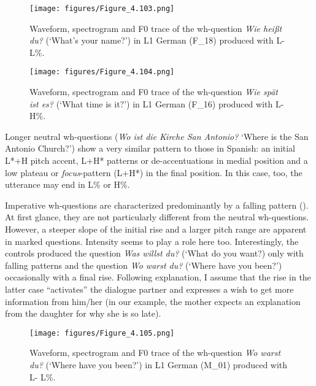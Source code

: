 \begin{figure}


\texttt{[image: figures/Figure\_4.103.png]}


\caption{Waveform, spectrogram and F0 trace of the wh-question \textit{Wie heißt du?} (‘What’s your name?’) in L1 German (F\_18) produced with L- L\%.}
\label{fig:4.103}
\end{figure}

\begin{figure}


\texttt{[image: figures/Figure\_4.104.png]}


\caption{Waveform, spectrogram and F0 trace of the wh-question \textit{Wie spät ist es?} (‘What time is it?’) in L1 German (F\_16) produced with L- H\%.}
\label{fig:4.104}
\end{figure}

Longer neutral wh-questions (\textit{Wo ist die Kirche San Antonio?} ‘Where is the San Antonio Church?’) show a very similar pattern to those in Spanish: an initial L*+H pitch accent, L+H* patterns or de-accentuations in medial position and a low plateau or \textit{focus}{}-pattern (L+H*) in the final position. In this case, too, the utterance may end in L\% or H\%.


Imperative wh-questions are characterized predominantly by a falling pattern (). At first glance, they are not particularly different from the neutral wh-questions. However, a steeper slope of the initial rise and a larger pitch range are apparent in marked questions. Intensity seems to play a role here too. Interestingly, the controls produced the question \textit{Was willst du?} (‘What do you want?) only with falling patterns and the question \textit{Wo warst du?} (‘Where have you been?’) occasionally with a final rise. Following  explanation, I assume that the rise in the latter case “activates” the dialogue partner and expresses a wish to get more information from him/her (in our example, the mother expects an explanation from the daughter for why she is so late).


\vfill
\begin{figure}[H]
\texttt{[image: figures/Figure\_4.105.png]}
\caption{Waveform, spectrogram and F0 trace of the wh-question \textit{Wo warst du?} (‘Where have you been?’) in L1 German (M\_01) produced with L- L\%.}
\label{fig:4.105}
\end{figure}
\vfill\pagebreak

